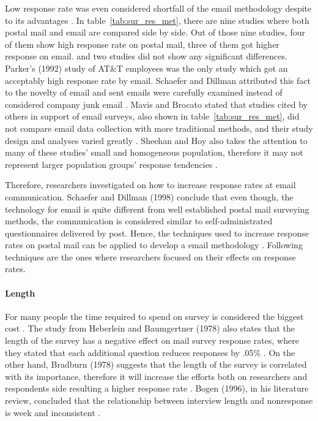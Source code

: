 Low response rate was even considered shortfall of the email methodology despite to its advantages \citep{BachmannD.ElfrinkJ.&Vazzana1999}. In table~\ref{tab:sur_res_met}, there are nine studies where both postal mail and email are compared side by side. Out of those nine studies, four of them show high response rate on postal mail, three of them got higher response on email. and two studies did not show any significant differences. Parker's (1992) study of AT\&T employees was the only study which got an acceptably high response rate by email. Schaefer and Dillman attributed this fact to the novelty of email and sent emails were carefully examined instead of considered company junk email \citep{Schaefer1998}. Mavis and Brocato stated that studies cited by others in support of email surveys, also shown in table~\ref{tab:sur_res_met}, did not compare email data collection with more traditional methods, and their study design and analyses varied greatly \citep{Mavis1998}. Sheehan and Hoy also takes the attention to many of these studies' small and homogeneous population, therefore it may not represent larger population groups' response tendencies \citep{Sheehan2006}.
\vspace{1cm}

Therefore, researchers investigated on how to increase response rates at email communication. Schaefer and Dillman (1998) conclude that even though, the technology for email is quite different from well established postal mail surveying methods, the communication is considered similar to self-administrated questionnaires delivered by post. Hence, the techniques used to increase response rates on postal mail can be applied to develop a email methodology \citep{Schaefer1998}. Following techniques are the ones where researchers focused on their effects on response rates.

\paragraph{Length}
For many people the time required to spend on survey is considered the biggest cost \citep[page 26]{DillmanDonA.SmythJoleneD.Christian2009}. The study from Heberlein and Baumgertner (1978) also states that the length of the survey has a negative effect on mail survey response rates, where they stated that each additional question reduces responses by .05\% \citep{Heberlein1978}. On the other hand, Bradburn (1978) suggests that the length of the survey is correlated with its importance, therefore it will increase the efforts both on researchers and respondents side resulting a higher response rate \citep{Bradburn1978}. Bogen (1996), in his literature review, concluded that the relationship between interview length and nonresponse is week and inconsistent \citep{Bogen1996}.

